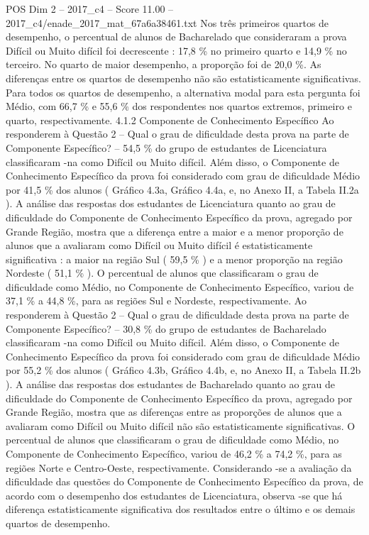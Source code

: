 \begin{textsample}{POS Dim 2 – 2017\_c4 – Score 11.00 – 2017\_c4/enade\_2017\_mat\_67a6a38461.txt}
Nos três primeiros quartos de desempenho, o percentual de alunos de Bacharelado que consideraram a prova Difícil ou Muito difícil foi decrescente : 17,8 \% no primeiro quarto e 14,9 \% no terceiro.
No quarto de maior desempenho, a proporção foi de 20,0 \%.
As diferenças entre os quartos de desempenho não são estatisticamente significativas.
Para todos os quartos de desempenho, a alternativa modal para esta pergunta foi Médio, com 66,7 \% e 55,6 \% dos respondentes nos quartos extremos, primeiro e quarto, respectivamente. 4.1.2 Componente de Conhecimento Específico Ao responderem à Questão 2 – Qual o grau de dificuldade desta prova na parte de Componente Específico? – 54,5 \% do grupo de estudantes de Licenciatura classificaram -na como Difícil ou Muito difícil.
Além disso, o Componente de Conhecimento Específico da prova foi considerado com grau de dificuldade Médio por 41,5 \% dos alunos ( Gráfico 4.3a, Gráfico 4.4a, e, no Anexo II, a Tabela II.2a ).
A análise das respostas dos estudantes de Licenciatura quanto ao grau de dificuldade do Componente de Conhecimento Específico da prova, agregado por Grande Região, mostra que a diferença entre a maior e a menor proporção de alunos que a avaliaram como Difícil ou Muito difícil é estatisticamente significativa : a maior na região Sul ( 59,5 \% ) e a menor proporção na região Nordeste ( 51,1 \% ).
O percentual de alunos que classificaram o grau de dificuldade como Médio, no Componente de Conhecimento Específico, variou de 37,1 \% a 44,8 \%, para as regiões Sul e Nordeste, respectivamente.
Ao responderem à Questão 2 – Qual o grau de dificuldade desta prova na parte de Componente Específico? – 30,8 \% do grupo de estudantes de Bacharelado classificaram -na como Difícil ou Muito difícil.
Além disso, o Componente de Conhecimento Específico da prova foi considerado com grau de dificuldade Médio por 55,2 \% dos alunos ( Gráfico 4.3b, Gráfico 4.4b, e, no Anexo II, a Tabela II.2b ).
A análise das respostas dos estudantes de Bacharelado quanto ao grau de dificuldade do Componente de Conhecimento Específico da prova, agregado por Grande Região, mostra que as diferenças entre as proporções de alunos que a avaliaram como Difícil ou Muito difícil não são estatisticamente significativas.
O percentual de alunos que classificaram o grau de dificuldade como Médio, no Componente de Conhecimento Específico, variou de 46,2 \% a 74,2 \%, para as regiões Norte e Centro-Oeste, respectivamente.
Considerando -se a avaliação da dificuldade das questões do Componente de Conhecimento Específico da prova, de acordo com o desempenho dos estudantes de Licenciatura, observa -se que há diferença estatisticamente significativa dos resultados entre o último e os demais quartos de desempenho.

\end{textsample}
